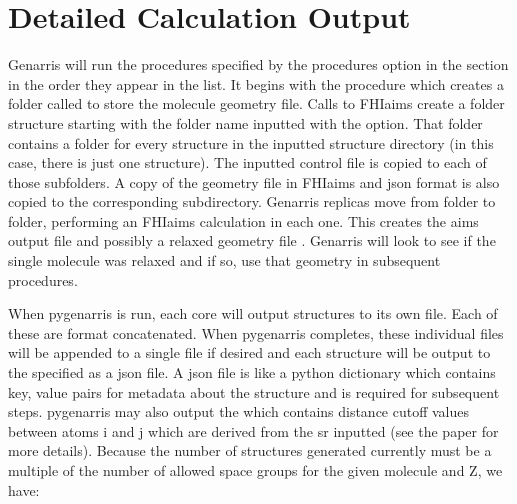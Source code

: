 \documentclass[letterpaper,10pt,english]{sphinxmanual}
\begin{document}
\section{Detailed Calculation Output}
\label{\detokenize{index:detailed-calculation-output}}\label{\detokenize{index:detailed-instructions}}
Genarris will run the procedures specified by the procedures option in the
 section in the order they appear in the list.
It begins with the  procedure which creates a folder
called  to store the
molecule geometry file. Calls to FHI\sphinxhyphen{}aims create a folder structure starting
with the folder name inputted with the  option.
That folder contains a folder for every structure in the inputted structure
directory (in this case, there is just one structure). The
inputted control file is copied to each of those subfolders. A copy of the
geometry file in FHI\sphinxhyphen{}aims and json format is also copied to the
corresponding subdirectory. Genarris replicas move from folder to folder,
performing an FHI\sphinxhyphen{}aims calculation in each one. This creates
the aims output file  and possibly a relaxed geometry file
. Genarris will look to see if the single molecule
was relaxed and if so, use that geometry in subsequent procedures.

When pygenarris is run, each core will output structures to its own
 file. Each of these are  format concatenated.
When pygenarris completes, these individual files will be appended to a
single  file if desired and each structure will be
output to the  specified as a json file. A json file is like a
python dictionary which contains key, value pairs for metadata
about the structure and is required for subsequent steps. pygenarris may also
output the  which contains distance cutoff
values between atoms i and j which are derived from the sr inputted
(see the paper for more details). Because the number of structures generated
currently must be a multiple of the number of allowed space groups for the
given molecule and Z, we have:

\begin{sphinxVerbatim}[commandchars=\\\{\}]
 
                 
                  
\end{sphinxVerbatim}
\end{document}
